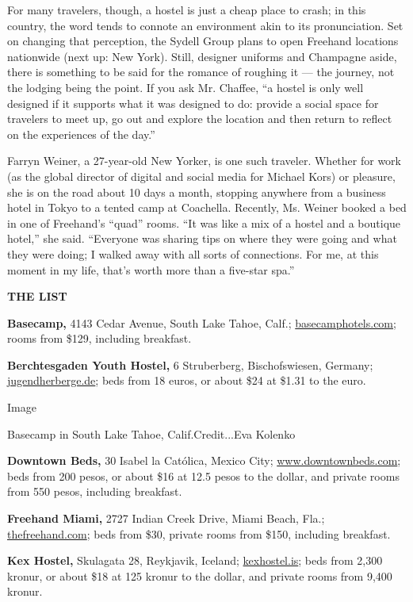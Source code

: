 For many travelers, though, a hostel is just a cheap place to crash; in
this country, the word tends to connote an environment akin to its
pronunciation. Set on changing that perception, the Sydell Group plans
to open Freehand locations nationwide (next up: New York). Still,
designer uniforms and Champagne aside, there is something to be said for
the romance of roughing it --- the journey, not the lodging being the
point. If you ask Mr. Chaffee, ``a hostel is only well designed if it
supports what it was designed to do: provide a social space for
travelers to meet up, go out and explore the location and then return to
reflect on the experiences of the day.''

Farryn Weiner, a 27-year-old New Yorker, is one such traveler. Whether
for work (as the global director of digital and social media for Michael
Kors) or pleasure, she is on the road about 10 days a month, stopping
anywhere from a business hotel in Tokyo to a tented camp at Coachella.
Recently, Ms. Weiner booked a bed in one of Freehand's ``quad'' rooms.
``It was like a mix of a hostel and a boutique hotel,'' she said.
``Everyone was sharing tips on where they were going and what they were
doing; I walked away with all sorts of connections. For me, at this
moment in my life, that's worth more than a five-star spa.''

\textbf{THE LIST}

\textbf{Basecamp,} 4143 Cedar Avenue, South Lake Tahoe, Calf.;
\href{http://basecamphotels.com}{basecamphotels.com}; rooms from \$129,
including breakfast.

\textbf{Berchtesgaden Youth Hostel,} 6 Struberberg, Bischofswiesen,
Germany;
\href{http://www.jugendherberge.de/en/hostels/search/portrait/jh.jsp?IDJH=656}{jugendherberge.de};
beds from 18 euros, or about \$24 at \$1.31 to the euro.

Image

Basecamp in South Lake Tahoe, Calif.Credit...Eva Kolenko

\textbf{Downtown Beds,} 30 Isabel la Católica, Mexico City;
\href{http://www.downtownbeds.com}{www.downtownbeds.com}; beds from 200
pesos, or about \$16 at 12.5 pesos to the dollar, and private rooms from
550 pesos, including breakfast.

\textbf{Freehand Miami,} 2727 Indian Creek Drive, Miami Beach, Fla.;
\href{http://thefreehand.com}{thefreehand.com}; beds from \$30, private
rooms from \$150, including breakfast.

\textbf{Kex Hostel,} Skulagata 28, Reykjavik, Iceland;
\href{http://kexhostel.is}{kexhostel.is}; beds from 2,300 kronur, or
about \$18 at 125 kronur to the dollar, and private rooms from 9,400
kronur.

